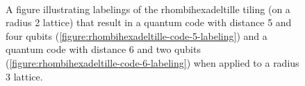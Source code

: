\documentclass[12pt]{amsbook}
\theoremstyle{plain}
\theoremstyle{definition}
\theoremstyle{remark}
\begin{document}
\begin{figure}
\\
\caption{
\label{figure:rhombihexadeltille-code-56-labelings}
A figure illustrating labelings of the rhombihexadeltille tiling (on a radius 2 lattice) that result in a quantum code with distance 5 and four qubits (\ref{figure:rhombihexadeltille-code-5-labeling}) and a quantum code with distance 6 and two qubits (\ref{figure:rhombihexadeltille-code-6-labeling}) when applied to a radius 3 lattice.
}
\end{figure}
\end{document}
